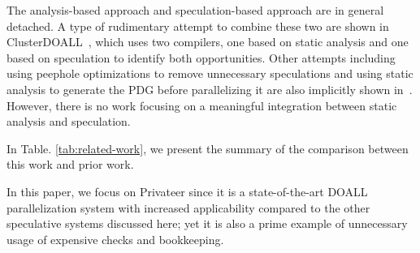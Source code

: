 

The analysis-based approach and speculation-based approach are in general
detached. A type of rudimentary attempt to combine these two are shown in
ClusterDOALL~\cite{kim:12:cgo}, which uses two compilers, one based on static
analysis and one based on speculation to identify both opportunities. Other
attempts including using peephole optimizations to remove unnecessary
speculations and using static analysis to generate the PDG before parallelizing
it are also implicitly shown in~\cite{johnson:12:pldi,ctian:2008:micro}.
However, there is no work focusing on a meaningful integration between static
analysis and speculation.

In Table. \ref{tab:related-work}, we present the summary of the comparison
between this work and prior work.



In this paper, we focus on Privateer since it is a state-of-the-art DOALL
parallelization system with increased applicability compared to the other
speculative systems discussed here; yet it is also a prime example of
unnecessary usage of expensive checks and bookkeeping.

